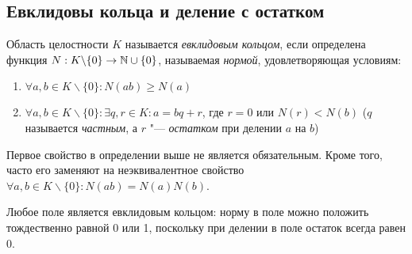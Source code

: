 \subsection{Евклидовы кольца и деление с остатком	}

\begin{definition}
	Область целостности $K$ называется \textit{евклидовым кольцом}, если определена функция $N: K\backslash\{0\} \to \mathbb{N} \cup \{0\}$, называемая \textit{нормой}, удовлетворяющая условиям:
	\begin{enumerate}
		\item $\forall a, b \in K\backslash\{0\}: N(ab) \ge N(a)$
		\item $\forall a, b \in K\backslash\{0\}: \exists q, r \in K: a = bq + r$, где $r = 0$ или $N(r) < N(b)$ ($q$ называется \textit{частным}, а $r$ "--- \textit{остатком} при делении $a$ на $b$)
	\end{enumerate}
\end{definition}

\begin{note}
	Первое свойство в определении выше не является обязательным. Кроме того, часто его заменяют на неэквивалентное свойство $\forall a, b \in K \backslash \{0\}: N(ab) = N(a)N(b)$.
\end{note}

\begin{note}
	Любое поле является евклидовым кольцом: норму в поле можно положить тождественно равной 0 или 1, поскольку при делении в поле остаток всегда равен $0$.
\end{note}

